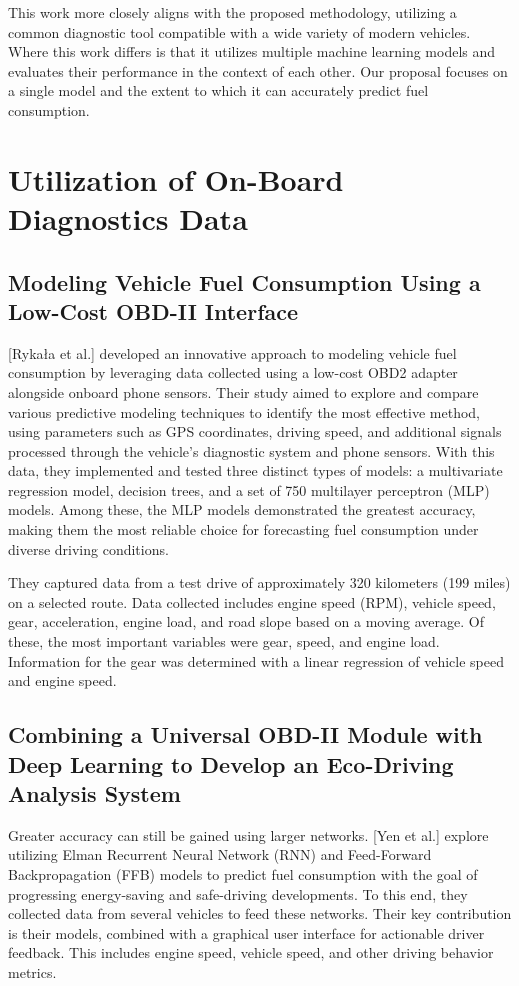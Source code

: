 \documentclass[letterpaper]{article}
\begin{document}
This work more closely aligns with the proposed methodology, utilizing
a common diagnostic tool compatible with a wide variety of modern vehicles.
Where this work differs is that it utilizes multiple machine learning models and
evaluates their performance in the context of each other. Our proposal focuses
on a single model and the extent to which it can accurately predict fuel
consumption.

\section*{Utilization of On-Board Diagnostics Data}

\subsection*{Modeling Vehicle Fuel Consumption Using a Low-Cost OBD-II Interface}

[Rykała et al.] developed an innovative approach to modeling vehicle fuel
consumption by leveraging data collected using a low-cost OBD2 adapter alongside
onboard phone sensors. Their study aimed to explore and compare various
predictive modeling techniques to identify the most effective method, using
parameters such as GPS coordinates, driving speed, and additional signals
processed through the vehicle's diagnostic system and phone sensors. With this
data, they implemented and tested three distinct types of models: a multivariate
regression model, decision trees, and a set of 750 multilayer perceptron (MLP)
models. Among these, the MLP models demonstrated the greatest accuracy, making
them the most reliable choice for forecasting fuel consumption under diverse
driving conditions. 

They captured data from a test drive of approximately 320
kilometers (199 miles) on a selected route. Data collected includes engine speed
(RPM), vehicle speed, gear, acceleration, engine load, and road slope based on a
moving average. Of these, the most important variables were gear, speed, and
engine load. Information for the gear was determined with a linear regression of
vehicle speed and engine speed.

\subsection*{Combining a Universal OBD-II Module with Deep Learning to Develop
an Eco-Driving Analysis System}

Greater accuracy can still be gained using larger networks. [Yen et al.] explore
utilizing Elman Recurrent Neural Network (RNN) and Feed-Forward Backpropagation
(FFB) models to predict fuel consumption with the goal of progressing
energy-saving and safe-driving developments. To this end, they collected data
from several vehicles to feed these networks. Their key contribution is their
models, combined with a graphical user interface for actionable driver feedback.
This includes engine speed, vehicle speed, and other driving behavior metrics.
\end{document}
